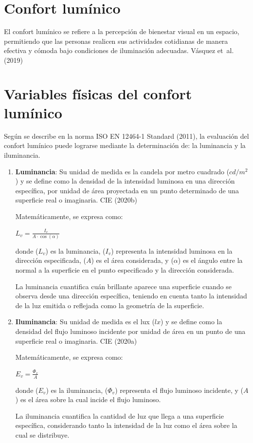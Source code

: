 \documentclass[
  letterpaper,
]{scrbook}
\begin{document}
\section{Confort lumínico}\label{confort-lumuxednico}

El confort lumínico se refiere a la percepción de bienestar visual en un
espacio, permitiendo que las personas realicen sus actividades
cotidianas de manera efectiva y cómoda bajo condiciones de iluminación
adecuadas. Vásquez et~al. (2019)

\section{Variables físicas del confort
lumínico}\label{variables-fuxedsicas-del-confort-lumuxednico}

Según se describe en la norma ISO EN 12464-1 Standard (2011), la
evaluación del confort lumínico puede lograrse mediante la determinación
de: la luminancia y la iluminancia.

\begin{enumerate}
\def\labelenumi{\arabic{enumi}.}
\item
  \textbf{Luminancia}: Su unidad de medida es la candela por metro
  cuadrado (\(cd/m^2\)) y se define como la densidad de la intensidad
  luminosa en una dirección específica, por unidad de área proyectada en
  un punto determinado de una superficie real o imaginaria. CIE (2020b)

  Matemáticamente, se expresa como:

  \(L_v = \frac{I_v}{A \cdot \cos(\alpha)}\)

  donde (\(L_v\)) es la luminancia, (\(I_v\)) representa la intensidad
  luminosa en la dirección especificada, (\(A\)) es el área considerada,
  y (\(\alpha\)) es el ángulo entre la normal a la superficie en el
  punto especificado y la dirección considerada.

  La luminancia cuantifica cuán brillante aparece una superficie cuando
  se observa desde una dirección específica, teniendo en cuenta tanto la
  intensidad de la luz emitida o reflejada como la geometría de la
  superficie.
\item
  \textbf{Iluminancia}: Su unidad de medida es el lux (\(lx\)) y se
  define como la densidad del flujo luminoso incidente por unidad de
  área en un punto de una superficie real o imaginaria. CIE (2020a)

  Matemáticamente, se expresa como:

  \(E_v = \frac{\Phi_v}{A}\)

  donde (\(E_v\)) es la iluminancia, (\(\Phi_v\)) representa el flujo
  luminoso incidente, y (\(A\)) es el área sobre la cual incide el flujo
  luminoso.

  La iluminancia cuantifica la cantidad de luz que llega a una
  superficie específica, considerando tanto la intensidad de la luz como
  el área sobre la cual se distribuye.
\end{enumerate}
\end{document}
